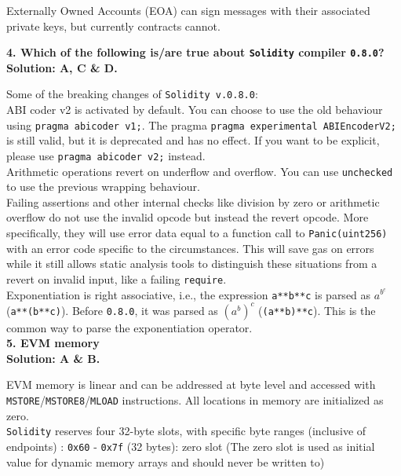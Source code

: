 Externally Owned Accounts (EOA) can sign messages with their associated private keys, but currently contracts cannot.\\

\pagebreak

\textbf{4. Which of the following is/are true about \texttt{Solidity} compiler \texttt{0.8.0}?}\label{sec:exam3_q4}\\

\textbf{Solution: A, C \& D.}

Some of the breaking changes of \verb|Solidity v.0.8.0|:\\

ABI coder v2 is activated by default.
You can choose to use the old behaviour using \verb|pragma abicoder v1;|.
The pragma \verb|pragma experimental ABIEncoderV2;| is still valid, but it is deprecated and has no effect.
If you want to be explicit, please use \verb|pragma abicoder v2;| instead.\\

Arithmetic operations revert on underflow and overflow.
You can use \verb|unchecked| to use the previous wrapping behaviour.\\

Failing assertions and other internal checks like division by zero or arithmetic overflow do not use the invalid opcode but instead the revert opcode.
More specifically, they will use error data equal to a function call to \verb|Panic(uint256)| with an error code specific to the circumstances.
This will save gas on errors while it still allows static analysis tools to distinguish these situations from a revert on invalid input, like a failing \verb|require|.\\

Exponentiation is right associative, i.e., the expression \verb|a**b**c| is parsed as $a^{b^c}$ (\verb|a**(b**c)|).
Before \verb|0.8.0|, it was parsed as $\left(a^b\right)^c$ (\verb|(a**b)**c|).
This is the common way to parse the exponentiation operator.\\

\textbf{5. EVM memory}\label{sec:exam3_q5}\\

\textbf{Solution: A \& B.}

EVM memory is linear and can be addressed at byte level and accessed with \verb|MSTORE|/\verb|MSTORE8|/\verb|MLOAD| instructions.
All locations in memory are initialized as zero.\\

\verb|Solidity| reserves four 32-byte slots, with specific byte ranges (inclusive of endpoints) : \verb|0x60| - \verb|0x7f| (32 bytes): zero slot (The zero slot is used as initial value for dynamic memory arrays and should never be written to)\\

